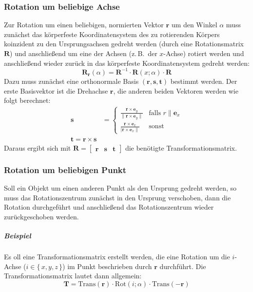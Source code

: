 \documentclass[a4paper, 11pt, accentcolor = tud3b]{tudreport}
\newcommand{\mat}[1]{\boldsymbol{#1}}
\renewcommand{\vec}[1]{\boldsymbol{\mathbf{#1}}}
\newcommand{\zB}{z.\,B.~}
\begin{document}
				\subsubsection{Rotation um beliebige Achse}
					Zur Rotation um einen beliebigen, normierten Vektor \( \vec{r} \) um den Winkel \(\alpha\) muss zunächst das körperfeste Koordinatensystem des zu rotierenden Körpers koinzident zu den Ursprungsachsen gedreht werden (durch eine Rotationsmatrix \( \mat{R} \)) und anschließend um eine der Achsen (\zB der \(x\)-Achse) rotiert werden und anschließend wieder zurück in das körperfeste Koordinatensystem gedreht werden:
					\begin{equation*}
						\mat{R}_{\vec{r}}(\alpha) = \mat{R}^{-1} \cdot \mat{R}(x; \alpha) \cdot \mat{R}
					\end{equation*}
					Dazu muss zunächst eine orthonormale Basis \( (\vec{r}, \vec{s}, \vec{t}) \) bestimmt werden. Der erste Basisvektor ist die Drehachse \(\vec{r}\), die anderen beiden Vektoren werden wie folgt berechnet:
					\begin{align*}
						\vec{s} &=
							\begin{cases}
								\frac{\vec{r} \times \vec{e}_y}{\lVert \vec{r} \times \vec{e}_y \rVert} & \text{falls } r \parallel \vec{e}_x \\
								\frac{\vec{r} \times \vec{e}_x}{\lvert \vec{r} \times \vec{e}_x \rVert} & \text{sonst}
							\end{cases} \\
						\vec{t} = \vec{r} \times \vec{s}
					\end{align*}
					Daraus ergibt sich mit \( \mat{R} = \begin{bmatrix} \vec{r} & \vec{s} & \vec{t} \end{bmatrix} \) die benötigte Transformationsmatrix.

				\subsubsection{Rotation um beliebigen Punkt}
					Soll ein Objekt um einen anderen Punkt als den Ursprung gedreht werden, so muss das Rotationszentrum zunächst in den Ursprung verschoben, dann die Rotation durchgeführt und anschließend das Rotationszentrum wieder zurückgeschoben werden.
					
					\subparagraph{Beispiel}
					Es oll eine Transformationsmatrix erstellt werden, die eine Rotation um die \(i\)-Achse (\( i \in \{\, x, y, z \,\} \)) im Punkt beschrieben durch \( \vec{r} \) durchführt. Die Transformationsmatrix lautet dann allgemein:
					\begin{equation*}
						\mat{T} = \text{Trans}(\vec{r}) \cdot \text{Rot}(i; \alpha) \cdot \text{Trans}(-\vec{r})
					\end{equation*}
\end{document}
